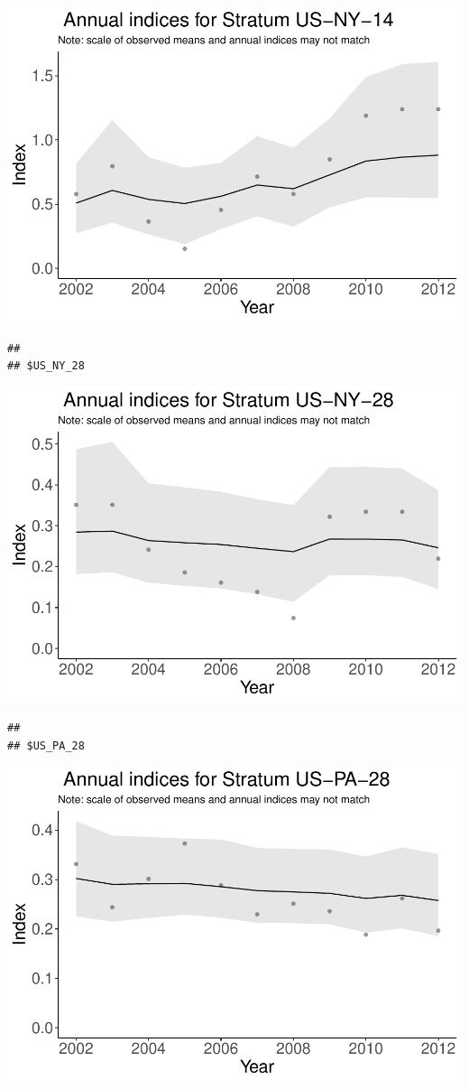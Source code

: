 \documentclass[]{article}
\begin{document}
\includegraphics{index_files/figure-latex/unnamed-chunk-7-25.pdf}

\begin{verbatim}
## 
## $US_NY_28
\end{verbatim}

\includegraphics{index_files/figure-latex/unnamed-chunk-7-26.pdf}

\begin{verbatim}
## 
## $US_PA_28
\end{verbatim}

\includegraphics{index_files/figure-latex/unnamed-chunk-7-27.pdf}
\end{document}
